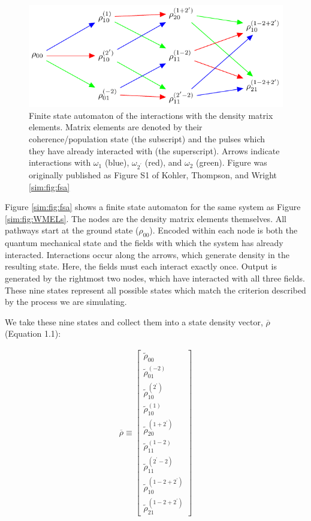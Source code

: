 \begin{figure}
\centering
\includegraphics{simulation/images/flow_diagram.pdf}
\caption{Finite state automaton of the interactions with the density
matrix elements. Matrix elements are denoted by their
coherence/population state (the subscript) and the pulses which they
have already interacted with (the superscript). Arrows indicate
interactions with \(\omega_1\) (blue), \(\omega_{2^\prime}\) (red), and
\(\omega_2\) (green). Figure was originally published as Figure S1 of
Kohler, Thompson, and Wright \cite{KohlerDanielDavid2017a} \ref{sim:fig:fsa}}
\end{figure}

Figure \ref{sim:fig:fsa} shows a finite state automaton for the same
system as Figure \ref{sim:fig:WMELs}. The nodes are the density matrix
elements themselves. All pathways start at the ground state
(\(\rho_{00}\)). Encoded within each node is both the quantum mechanical
state and the fields with which the system has already interacted.
Interactions occur along the arrows, which generate density in the
resulting state. Here, the fields must each interact exactly once.
Output is generated by the rightmost two nodes, which have interacted
with all three fields. These nine states represent all possible states
which match the criterion described by the process we are simulating.

We take these nine states and collect them into a state density vector,
\(\overline{\rho}\) (Equation 1.1):

\[\begin{aligned}
\overline{\rho} \equiv
\begin{bmatrix}
\tilde{\rho}_{00} \\
\tilde{\rho}_{01}^{(-2)} \\
\tilde{\rho}_{10}^{(2^\prime)} \\
\tilde{\rho}_{10}^{(1)} \\
\tilde{\rho}_{20}^{(1+2^\prime)} \\
\tilde{\rho}_{11}^{(1-2)} \\
\tilde{\rho}_{11}^{(2^\prime-2)} \\
\tilde{\rho}_{10}^{(1-2+2^\prime)} \\
\tilde{\rho}_{21}^{(1-2+2^\prime)}
\end{bmatrix}
\end{aligned}\]

